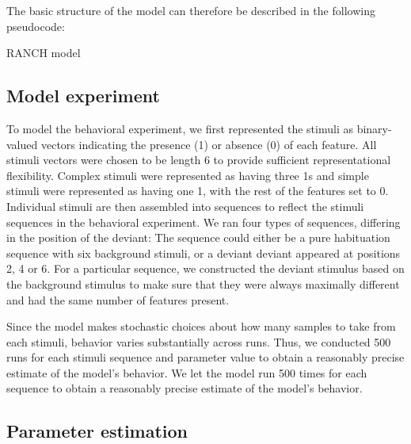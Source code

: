 \documentclass[10pt, letterpaper]{article}
\begin{document}
The basic structure of the model can therefore be described in the
following pseudocode:

\begin{algorithm}
  \caption*{RANCH model}\label{msn}
  \begin{algorithmic}
  \NoDo{}
    \NoThen{}
    \EndIf
    \EndWhile
  \EndFor
\end{algorithmic}
  \end{algorithm}

\hypertarget{model-experiment}{%
\subsection{Model experiment}\label{model-experiment}}

To model the behavioral experiment, we first represented the stimuli as
binary-valued vectors indicating the presence (1) or absence (0) of each
feature. All stimuli vectors were chosen to be length 6 to provide
sufficient representational flexibility. Complex stimuli were
represented as having three 1s and simple stimuli were represented as
having one 1, with the rest of the features set to 0. Individual stimuli
are then assembled into sequences to reflect the stimuli sequences in
the behavioral experiment. We ran four types of sequences, differing in
the position of the deviant: The sequence could either be a pure
habituation sequence with six background stimuli, or a deviant deviant
appeared at positions 2, 4 or 6. For a particular sequence, we
constructed the deviant stimulus based on the background stimulus to
make sure that they were always maximally different and had the same
number of features present.

Since the model makes stochastic choices about how many samples to take
from each stimuli, behavior varies substantially across runs. Thus, we
conducted 500 runs for each stimuli sequence and parameter value to
obtain a reasonably precise estimate of the model's behavior. We let the
model run 500 times for each sequence to obtain a reasonably precise
estimate of the model's behavior.

\hypertarget{parameter-estimation}{%
\subsection{Parameter estimation}\label{parameter-estimation}}
\end{document}
